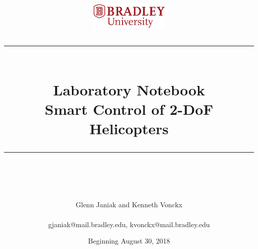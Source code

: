 \documentclass[fontsize=11pt, %
                             paper=letter, %
                             openany, %
                             captions=tableheading,
                             index=totoc,
                             hyperref]{labbook}
\newcommand{\HRule}{\rule{\linewidth}{0.5mm}} %
\begin{document}


%

\title{
\begin{center}
\href{http://www.bradley.edu}{\includegraphics[height=0.5in]{figs/logoBU1-Print}}
\vskip10pt
\HRule \\[0.4cm]
{\Huge \bfseries Laboratory Notebook \\[0.5cm] \Large Smart Control of 2-DoF Helicopters}\\[0.4cm] %
\HRule \\[1.5cm]
\end{center}
}
\author{\Huge Glenn Janiak and \Huge Kenneth Vonckx \\ \\\Large gjaniak@mail.bradley.edu, kvonckx@mail.bradley.edu} %
\date{Beginning August 30, 2018} %
\maketitle


\printindex
\tableofcontents %
\newpage %
\end{document}
